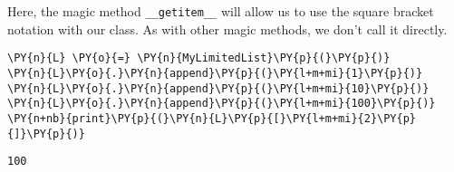 Here, the magic method \texttt{\_\_getitem\_\_} will allow us to use the square bracket notation with our class.  As with other magic methods, we don’t call it directly.


\begin{Verbatim}[commandchars=\\\{\}]
\PY{n}{L} \PY{o}{=} \PY{n}{MyLimitedList}\PY{p}{(}\PY{p}{)}
\PY{n}{L}\PY{o}{.}\PY{n}{append}\PY{p}{(}\PY{l+m+mi}{1}\PY{p}{)}
\PY{n}{L}\PY{o}{.}\PY{n}{append}\PY{p}{(}\PY{l+m+mi}{10}\PY{p}{)}
\PY{n}{L}\PY{o}{.}\PY{n}{append}\PY{p}{(}\PY{l+m+mi}{100}\PY{p}{)}
\PY{n+nb}{print}\PY{p}{(}\PY{n}{L}\PY{p}{[}\PY{l+m+mi}{2}\PY{p}{]}\PY{p}{)}
\end{Verbatim}

\begin{Verbatim}
100
\end{Verbatim}
